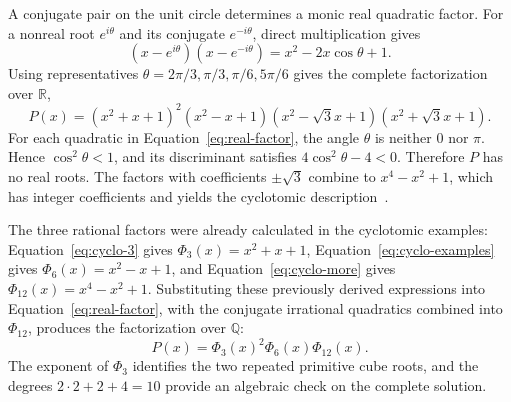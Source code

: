 \documentclass[11pt,a4paper]{article}
\numberwithin{equation}{section}
\theoremstyle{uprightpaper}
\newcommand{\R}{\mathbb{R}}
\newcommand{\Q}{\mathbb{Q}}
\begin{document}
A conjugate pair on the unit circle determines a monic real quadratic factor. For a nonreal root $e^{i\theta}$ and its conjugate $e^{-i\theta}$, direct multiplication gives
\begin{equation}\label{eq:conjugate-factor}
 (x-e^{i\theta})(x-e^{-i\theta})=x^2-2x\cos\theta+1.
\end{equation}
Using representatives $\theta=2\pi/3,\pi/3,\pi/6,5\pi/6$ gives the complete factorization over $\R$,
\begin{equation}\label{eq:real-factor}
 P(x)=(x^2+x+1)^2(x^2-x+1)
       (x^2-\sqrt3x+1)(x^2+\sqrt3x+1).
\end{equation}
For each quadratic in Equation~\eqref{eq:real-factor}, the angle $\theta$ is neither $0$ nor $\pi$. Hence $\cos^2\theta<1$, and its discriminant satisfies $4\cos^2\theta-4<0$. Therefore $P$ has no real roots. The factors with coefficients $\pm\sqrt3$ combine to $x^4-x^2+1$, which has integer coefficients and yields the cyclotomic description~\cite{dummit2004}.

The three rational factors were already calculated in the
cyclotomic examples: Equation~\eqref{eq:cyclo-3} gives
$\Phi_3(x)=x^2+x+1$, Equation~\eqref{eq:cyclo-examples} gives
$\Phi_6(x)=x^2-x+1$, and Equation~\eqref{eq:cyclo-more} gives
$\Phi_{12}(x)=x^4-x^2+1$. Substituting these previously derived
expressions into Equation~\eqref{eq:real-factor}, with the conjugate
irrational quadratics combined into $\Phi_{12}$, produces the
factorization over $\Q$:
\begin{equation}\label{eq:cyclotomic-original}
 P(x)=\Phi_3(x)^2\Phi_6(x)\Phi_{12}(x).
\end{equation}
The exponent of $\Phi_3$ identifies the two repeated primitive cube roots, and the degrees $2\cdot2+2+4=10$ provide an algebraic check on the complete solution.
\end{document}
